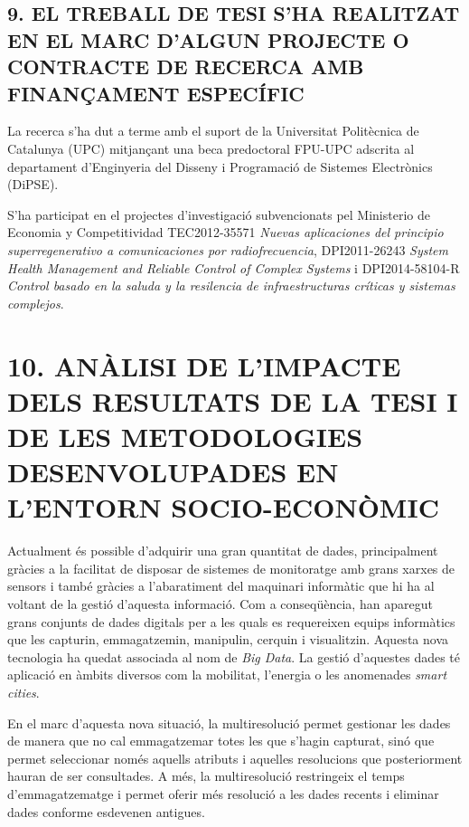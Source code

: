 \documentclass{scrartcl}
\begin{document}
\subsection*{9. EL TREBALL DE TESI S’HA REALITZAT EN EL MARC D’ALGUN PROJECTE O CONTRACTE DE RECERCA AMB FINANÇAMENT ESPECÍFIC}


La recerca s'ha dut a terme amb el suport de la Universitat
Politècnica de Catalunya (UPC) mitjançant una beca predoctoral FPU-UPC
adscrita al departament d'Enginyeria del Disseny i Programació de
Sistemes Electrònics (DiPSE).

S'ha participat en el projectes d'investigació subvencionats pel
Ministerio de Economia y Competitividad TEC2012-35571 \emph{Nuevas
  aplicaciones del principio superregenerativo a comunicaciones por
  radiofrecuencia}, DPI2011-26243 \emph{System Health Management and
  Reliable Control of Complex Systems} i DPI2014-58104-R \emph{Control
  basado en la saluda y la resilencia de infraestructuras críticas y
  sistemas complejos}.


\section*{10. ANÀLISI DE L’IMPACTE DELS RESULTATS DE LA TESI I DE LES METODOLOGIES DESENVOLUPADES EN L’ENTORN SOCIO-ECONÒMIC}
  

Actualment és possible d'adquirir una gran quantitat de dades,
principalment gràcies a la facilitat de disposar de sistemes de
monitoratge amb grans xarxes de sensors i també gràcies a
l'abaratiment del maquinari informàtic que hi ha al voltant de la
gestió d'aquesta informació.  Com a conseqüència, han aparegut grans
conjunts de dades digitals per a les quals es requereixen equips
informàtics que les capturin, emmagatzemin, manipulin, cerquin i
visualitzin. Aquesta nova tecnologia ha quedat associada al nom de
\emph{Big Data}.  La gestió d’aquestes dades té aplicació en àmbits
diversos com la mobilitat, l’energia o les  anomenades
\emph{smart cities}.




En el marc d'aquesta nova situació, la multiresolució permet gestionar
les dades de manera que no cal emmagatzemar totes les que s'hagin
capturat, sinó que permet seleccionar només aquells atributs i
aquelles resolucions que posteriorment hauran de ser consultades.  A
més, la multiresolució restringeix el temps
d'emmagatzematge i permet oferir més resolució a les dades recents i
eliminar dades conforme esdevenen antigues.
\end{document}
